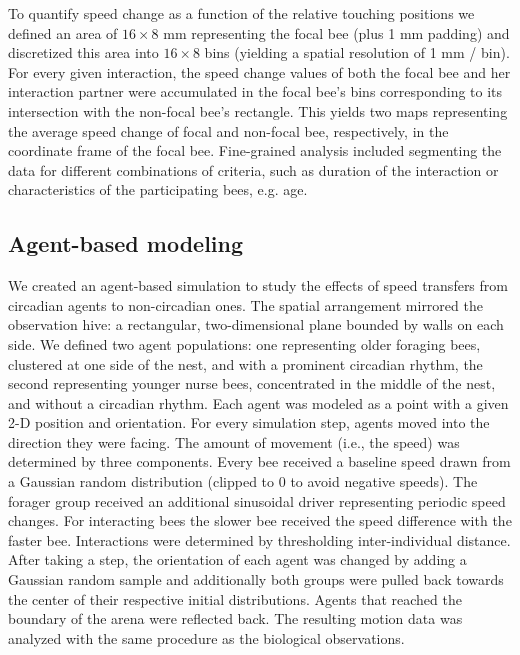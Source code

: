 \documentclass{article}
\newcommand{\deleted}[1]{{\color{red}#1}} %
\newcommand{\deleted}[1]{}
\begin{document}
\deleted{To quantify speed change as a function of the relative touching positions we defined an area of $16 \times 8$ mm representing the focal bee (plus 1 mm padding) and discretized this area into $16 \times 8$ bins (yielding a spatial resolution of 1 mm / bin). For every given interaction, the speed change values of both the focal bee and her interaction partner were accumulated in the focal bee’s bins corresponding to its intersection with the non-focal bee’s rectangle. This yields two maps representing the average speed change of focal and non-focal bee, respectively, in the coordinate frame of the focal bee.   Fine-grained analysis included segmenting the data for different combinations of criteria, such as duration of the interaction or characteristics of the participating bees, e.g. age.}

\subsection*{Agent-based modeling}
\deleted{We created an agent-based simulation to study the effects of speed transfers from circadian agents to non-circadian ones. The spatial arrangement mirrored the observation hive: a rectangular, two-dimensional plane bounded by walls on each side. We defined two agent populations: one representing older foraging bees, clustered at one side of the nest, and with a prominent circadian rhythm, the second representing younger nurse bees, concentrated in the middle of the nest, and without a circadian rhythm. Each agent was modeled as a point with a given 2-D position and orientation. For every simulation step, agents moved into the direction they were facing. The amount of movement (i.e., the speed) was determined by three components. Every bee received a baseline speed drawn from a Gaussian random distribution (clipped to 0 to avoid negative speeds). The forager group received an additional sinusoidal driver representing periodic speed changes. For interacting bees the slower bee received the speed difference with the faster bee. Interactions were determined by thresholding inter-individual distance. After taking a step, the orientation of each agent was changed by adding a Gaussian random sample and additionally both groups were pulled back towards the center of their respective initial distributions. Agents that reached the boundary of the arena were reflected back. The resulting motion data was analyzed with the same procedure as the biological observations.}
\end{document}
